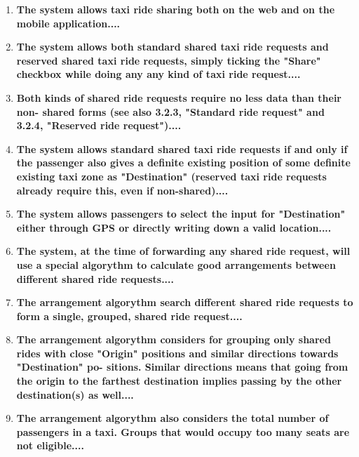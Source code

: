 \begin{enumerate}
	\item \textbf{The system allows taxi ride sharing both on the web and on the mobile
		application....}\\
	
	\item \textbf{The system allows both standard shared taxi ride requests and reserved
		shared taxi ride requests, simply ticking the "Share" checkbox while doing
		any any kind of taxi ride request....}\\	
	
	\item \textbf{Both kinds of shared ride requests require no less data than their non-
		shared forms (see also 3.2.3, "Standard ride request" and 3.2.4, "Reserved
		ride request")....}\\
	
	\item \textbf{The system allows standard shared taxi ride requests if and only if the
		passenger also gives a definite existing position of some definite existing
		taxi zone as "Destination" (reserved taxi ride requests already require this,
		even if non-shared)....}\\
	
	\item \textbf{The system allows passengers to select the input for "Destination" either
		through GPS or directly writing down a valid location....}\\
	
	\item \textbf{The system, at the time of forwarding any shared ride request, will use a
		special algorythm to calculate good arrangements between different shared
		ride requests....}\\
	
	\item \textbf{The arrangement algorythm search different shared ride requests to form
		a single, grouped, shared ride request....}\\
	
	\item \textbf{The arrangement algorythm considers for grouping only shared rides with
		close "Origin" positions and similar directions towards "Destination" po-
		sitions. Similar directions means that going from the origin to the farthest
		destination implies passing by the other destination(s) as well....}\\
	
	\item \textbf{The arrangement algorythm also considers the total number of passengers
		in a taxi. Groups that would occupy too many seats are not eligible....}\\
	

\end{enumerate}
